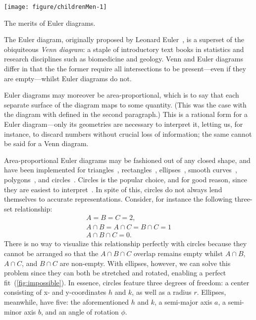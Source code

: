 \documentclass[
  oneside,
  openany,
  numbers=noendperiod,
  parskip=half,
  bibliography=totoc
]{scrbook}\usepackage[]{graphicx}\usepackage{xcolor}
\newenvironment{knitrout}{}{} %
\begin{document}
\begin{marginfigure}
\begin{knitrout}\small
{}\color{fgcolor}

{\centering \texttt{[image: figure/childrenMen-1]} 

}



\end{knitrout}
\caption{The merits of Euler diagrams.}
\label{fig:children-men}
\end{marginfigure}

The Euler diagram, originally proposed by Leonard Euler~\citep{Euler_1802}, is
a superset of the obiquiteous \emph{Venn diagram}: a staple of introductory
text books in statistics and research disciplines such as biomedicine and
geology. Venn and Euler diagrams differ in that the the former require all
intersections to be present---even if they are empty---whilst Euler diagrams do
not.

Euler diagrams may moreover be area-proportional, which is to say that each separate
surface of the diagram maps to some quantity. (This was the case with
the diagram with defined in the second paragraph.) This is a rational form for a
Euler diagram---only its geometries are necessary to interpret it, letting us, for
instance, to discard numbers without crucial loss of information; the same
cannot be said for a Venn diagram.

Area-proportional Euler diagrams may be fashioned out of any closed shape, and
have been implemented for triangles~\citep{Swinton_2011},
rectangles~\citep{Swinton_2011}, ellipses~\citep{Micallef_2014a}, smooth
curves~\citep{Micallef_2014}, polygons~\citep{Swinton_2011}, and
circles~\citep{Wilkinson_2012,Kestler_2008,Swinton_2011}. Circles is the
popular choice, and for good reason, since they are easiest to
interpret~\citep{Blake_2016}. In spite of this, circles do not always lend
themselves to accurate representations. Consider, for instance the following
three-set relationship:
\[
\begin{gathered}
A = B = C = 2,\\
A \cap B = A \cap C = B \cap C = 1\\
A \cap B \cap C = 0.
\end{gathered}
\]
There is no way to visualize this relationship perfectly with circles because
they cannot be arranged so that the $A \cap B \cap C$ overlap remains empty whilst
$A \cap B$, $A \cap C$, and $B \cap C$ are non-empty. With ellipses, however,
we can solve this problem since they can both be stretched and rotated, enabling
a perfect fit~(\cref{fig:impossible}). In essence, circles
feature three degrees of freedom: a center consisting of x- and
y-coordinates $h$ and $k$, as well as a radius $r$. Ellipses, meanwhile, have
five: the aforementioned $h$ and $k$, a semi-major axis $a$, a semi-minor axis
$b$, and an angle of rotation $\phi$.
\end{document}
